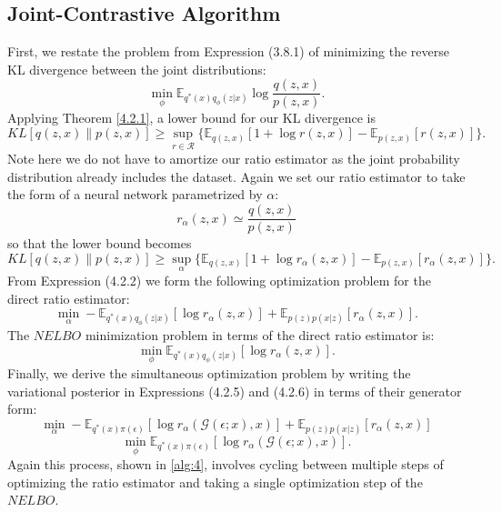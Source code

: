 \documentclass[honours,12pt]{unswthesis}
\newcommand{\E}{\mathbb{E}}
\numberwithin{equation}{section}
\theoremstyle{definition}
\begin{document}
\subsection{Joint-Contrastive Algorithm}\label{sec:4.2.3}
First, we restate the problem from Expression (3.8.1) of minimizing the reverse KL divergence between the joint distributions:
\[\min_\phi \mathbb{E}_{q^*(x)q_\phi(z|x)}\log \frac{q(z,x)}{p(z,x)}.\]
Applying Theorem \ref{4.2.1}, a lower bound for our KL divergence is
\[KL[q(z,x)\|p(z,x)]\geq \sup_{r\in \mathcal{R}}\{\mathbb{E}_{q(z,x)}[1+\log r(z,x)]-\mathbb{E}_{p(z,x)}[r(z,x)]\}.\]
Note here we do not have to amortize our ratio estimator as the joint probability distribution already includes the dataset. Again we set our ratio estimator to take the form of a neural network parametrized by $\alpha$:
\[r_\alpha(z,x)\simeq \frac{q(z,x)}{p(z,x)}\]
so that the lower bound becomes
\[KL[q(z,x)\|p(z,x)]\geq \sup_{\alpha}\{\mathbb{E}_{q(z,x)}[1+\log r_\alpha(z,x)]-\mathbb{E}_{p(z,x)}[r_\alpha(z,x)]\}.\]
From Expression (4.2.2) we form the following optimization problem for the direct ratio estimator:
\begin{equation}
\min_\alpha-\E_{q^*(x)q_\phi(z|x)}[\log r_\alpha(z,x)]+\E_{p(z)p(x|z)}[r_\alpha(z,x)].
\end{equation}
The $NELBO$ minimization problem in terms of the direct ratio estimator is:
\begin{equation}
\min_\phi \mathbb{E}_{q^*(x)q_\phi(z|x)}[\log r_\alpha(z,x)].
\end{equation}
Finally, we derive the simultaneous optimization problem by writing the variational posterior in Expressions (4.2.5) and (4.2.6) in terms of their generator form:
\[\min_\alpha -\mathbb{E}_{q^*(x)\pi(\epsilon)}[\log r_\alpha(\mathcal{G}(\epsilon;x),x)]+\mathbb{E}_{p(z)p(x|z)}[r_\alpha(z,x)]\]
\[\min_\phi \mathbb{E}_{q^*(x)\pi(\epsilon)}[\log r_\alpha(\mathcal{G}(\epsilon;x),x)].\]
Again this process, shown in \autoref{alg:4}, involves cycling between multiple steps of optimizing the ratio estimator and taking a single optimization step of the $NELBO$.
\newpage
\end{document}

